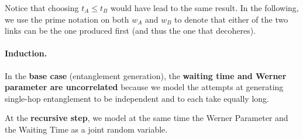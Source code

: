\documentclass{masterthesis}
\begin{document}
Notice that choosing $t_{A} \leq t_{B}$ would have lead to the same result.
In the following, we use the prime notation on both $w_A$ and $w_B$ to denote that either of the two links can be the one produced first (and thus the one that decoheres).

\paragraph*{Induction.}

In the \textbf{base case} (entanglement generation), the \textbf{waiting time and Werner parameter are uncorrelated} because we model the attempts at generating single-hop entanglement to be independent and to each take equally long.

At the \textbf{recursive step}, we model at the same time the Werner Parameter and the Waiting Time as a joint random variable. %




\end{document}
